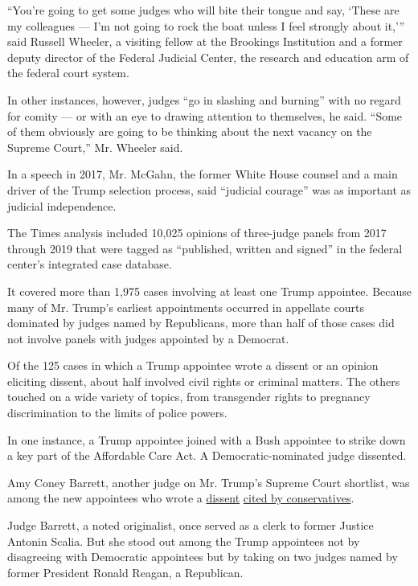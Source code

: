 ``You're going to get some judges who will bite their tongue and say,
`These are my colleagues --- I'm not going to rock the boat unless I
feel strongly about it,''' said Russell Wheeler, a visiting fellow at
the Brookings Institution and a former deputy director of the Federal
Judicial Center, the research and education arm of the federal court
system.

In other instances, however, judges ``go in slashing and burning'' with
no regard for comity --- or with an eye to drawing attention to
themselves, he said. ``Some of them obviously are going to be thinking
about the next vacancy on the Supreme Court,'' Mr. Wheeler said.

In a speech in 2017, Mr. McGahn, the former White House counsel and a
main driver of the Trump selection process, said ``judicial courage''
was as important as judicial independence.

The Times analysis included 10,025 opinions of three-judge panels from
2017 through 2019 that were tagged as ``published, written and signed''
in the federal center's integrated case database.

It covered more than 1,975 cases involving at least one Trump appointee.
Because many of Mr. Trump's earliest appointments occurred in appellate
courts dominated by judges named by Republicans, more than half of those
cases did not involve panels with judges appointed by a Democrat.

Of the 125 cases in which a Trump appointee wrote a dissent or an
opinion eliciting dissent, about half involved civil rights or criminal
matters. The others touched on a wide variety of topics, from
transgender rights to pregnancy discrimination to the limits of police
powers.

In one instance, a Trump appointee joined with a Bush appointee to
strike down a key part of the Affordable Care Act. A
Democratic-nominated judge dissented.

Amy Coney Barrett, another judge on Mr. Trump's Supreme Court shortlist,
was among the new appointees who wrote a
\href{http://media.ca7.uscourts.gov/cgi-bin/rssExec.pl?Submit=Display\&Path=Y2019/D03-15/C:18-1478:J:Flaum:aut:T:fnOp:N:2309276:S:0}{dissent}
\href{https://www.nationalreview.com/bench-memos/judge-barretts-dissent-in-second-amendment-case/}{cited
by conservatives}.

Judge Barrett, a noted originalist, once served as a clerk to former
Justice Antonin Scalia. But she stood out among the Trump appointees not
by disagreeing with Democratic appointees but by taking on two judges
named by former President Ronald Reagan, a Republican.

